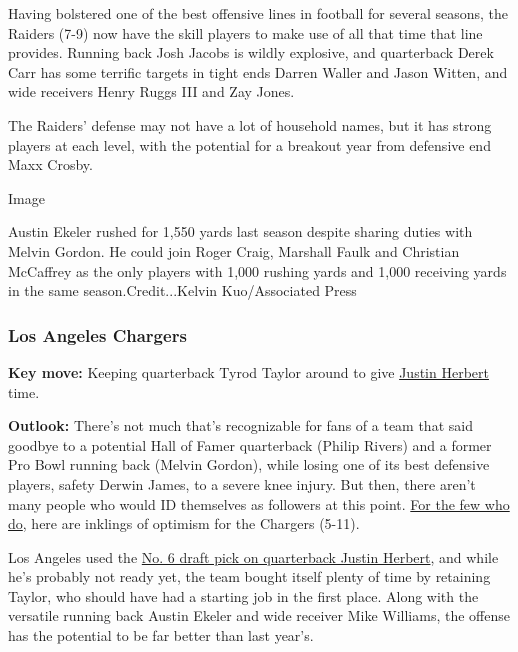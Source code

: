 Having bolstered one of the best offensive lines in football for several
seasons, the Raiders (7-9) now have the skill players to make use of all
that time that line provides. Running back Josh Jacobs is wildly
explosive, and quarterback Derek Carr has some terrific targets in tight
ends Darren Waller and Jason Witten, and wide receivers Henry Ruggs III
and Zay Jones.

The Raiders' defense may not have a lot of household names, but it has
strong players at each level, with the potential for a breakout year
from defensive end Maxx Crosby.

Image

Austin Ekeler rushed for 1,550 yards last season despite sharing duties
with Melvin Gordon. He could join Roger Craig, Marshall Faulk and
Christian McCaffrey as the only players with 1,000 rushing yards and
1,000 receiving yards in the same season.Credit...Kelvin Kuo/Associated
Press

\hypertarget{los-angeles-chargers}{%
\subsubsection{\texorpdfstring{\textbf{Los Angeles
Chargers}}{Los Angeles Chargers}}\label{los-angeles-chargers}}

\textbf{Key move:} Keeping quarterback Tyrod Taylor around to give
\href{https://www.nytimes3xbfgragh.onion/article/justin-herbert.html}{Justin
Herbert} time.

\textbf{Outlook:} There's not much that's recognizable for fans of a
team that said goodbye to a potential Hall of Famer quarterback (Philip
Rivers) and a former Pro Bowl running back (Melvin Gordon), while losing
one of its best defensive players, safety Derwin James, to a severe knee
injury. But then, there aren't many people who would ID themselves as
followers at this point.
\href{https://www.nytimes3xbfgragh.onion/2019/12/19/sports/football/if-the-chargers-score-and-no-ones-there-to-cheer-does-the-owner-care.html}{For
the few who do}, here are inklings of optimism for the Chargers (5-11).

Los Angeles used the
\href{https://www.nytimes3xbfgragh.onion/2020/04/23/sports/football/nfl-draft-live.html\#link-1f4f47de}{No.
6 draft pick on quarterback Justin Herbert}, and while he's probably not
ready yet, the team bought itself plenty of time by retaining Taylor,
who should have had a starting job in the first place. Along with the
versatile running back Austin Ekeler and wide receiver Mike Williams,
the offense has the potential to be far better than last year's.

